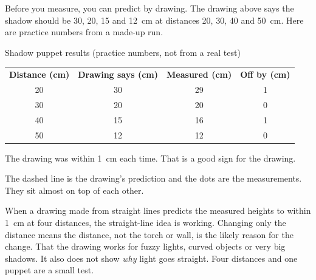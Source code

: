 Before you measure, you can predict by drawing. The drawing above says the shadow should be 30, 20, 15 and 12~cm at distances 20, 30, 40 and 50~cm. Here are practice numbers from a made-up run.

\begin{worked}{Shadow puppet results (practice numbers, not from a real test)}
\begin{center}\sffamily\small\renewcommand{\arraystretch}{1.3}
\begin{tabular}{@{}cccc@{}}
\textbf{Distance (cm)} & \textbf{Drawing says (cm)} & \textbf{Measured (cm)} & \textbf{Off by (cm)}\\
20 & 30 & 29 & 1\\
30 & 20 & 20 & 0\\
40 & 15 & 16 & 1\\
50 & 12 & 12 & 0
\end{tabular}
\end{center}
\end{worked}

The drawing was within 1~cm each time. That is a good sign for the drawing.

\clearpage

\begin{center}
\end{center}
The dashed line is the drawing's prediction and the dots are the measurements. They sit almost on top of each other.

{When a drawing made from straight lines predicts the measured heights to within 1~cm at four distances, the straight-line idea is working. Changing only the distance means the distance, not the torch or wall, is the likely reason for the change.}
{That the drawing works for fuzzy lights, curved objects or very big shadows. It also does not show \emph{why} light goes straight. Four distances and one puppet are a small test.}

